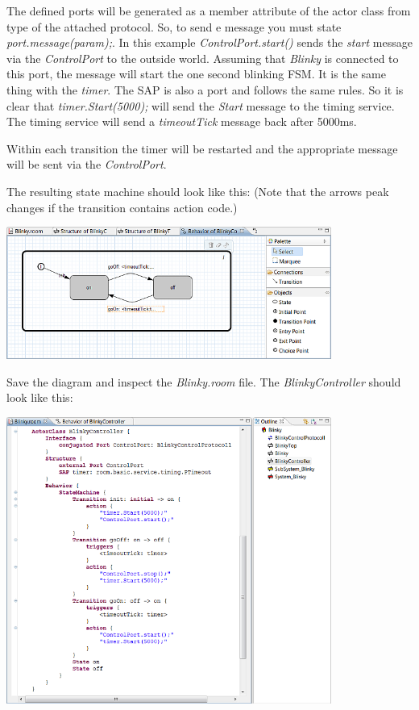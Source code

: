 The defined ports will be generated as a member attribute of the actor class from type of the attached 
protocol. So, to send e message you must state \textit{port.message(param);}. In this example 
\textit{ControlPort.start()} sends the \textit{start} message via the \textit{ControlPort} to the outside 
world. Assuming that \textit{Blinky} is connected to this port, the message will start the one second 
blinking FSM. It is the same thing with the \textit{timer}. The SAP is also a port and follows the same 
rules. So it is clear that \textit{timer.Start(5000);} will send the \textit{Start} message to the timing 
service. The timing service will send a \textit{timeoutTick} message back after 5000ms.

Within each transition the timer will be restarted and the appropriate message will be sent via the 
\textit{ControlPort}. 

The resulting state machine should look like this:
(Note that the arrows peak changes if the transition contains action code.)

\includegraphics[width=0.8\textwidth]{images/020-Blinky10.png}

Save the diagram and inspect the \textit{Blinky.room} file. The \textit{BlinkyController} should look like 
this:

\includegraphics[width=0.8\textwidth]{images/020-Blinky11.png}
 
